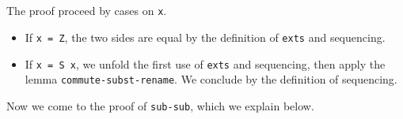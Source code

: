 \begin{fence}
\begin{code}
\AgdaSymbol{\}}\AgdaSpace{}%
\AgdaSpace{}%
\<%
\\
\>[5][@{}l@{\AgdaIndent{0}}]%
\>[7]\AgdaSpace{}%
\AgdaSpace{}%
\AgdaSymbol{(}\AgdaSpace{}%
\AgdaSpace{}%
\AgdaSpace{}%
\AgdaSymbol{(}\AgdaSpace{}%
\AgdaSymbol{))}\<%
\\
%
\>[5]\<%
\\
\>[5][@{}l@{\AgdaIndent{0}}]%
\>[7]\AgdaSpace{}%
\AgdaSpace{}%
\AgdaSymbol{((}\AgdaSpace{}%
\AgdaSpace{}%
\AgdaSymbol{)}\AgdaSpace{}%
\AgdaSymbol{)}\<%
\\
%
\>[5]\<%
\end{code}
\end{fence}

The proof proceed by cases on \texttt{x}.

\begin{itemize}
\item
  If \texttt{x\ =\ Z}, the two sides are equal by the definition of
  \texttt{exts} and sequencing.
\item
  If \texttt{x\ =\ S\ x}, we unfold the first use of \texttt{exts} and
  sequencing, then apply the lemma \texttt{commute-subst-rename}. We
  conclude by the definition of sequencing.
\end{itemize}

Now we come to the proof of \texttt{sub-sub}, which we explain below.

